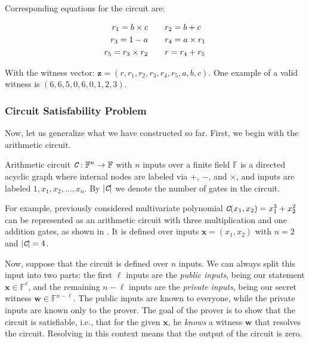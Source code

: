 \documentclass[../lecture-notes-148x210.tex]{subfiles}
\begin{document}
Corresponding equations for the circuit are:

\begin{equation*}
    \begin{aligned}
        r_1 = b \times c \hspace{10px} & & &
        r_2 = b + c \\
        r_3 = 1 - a \hspace{10px} & & &
        r_4 = a \times r_1 \\
        r_5 = r_3 \times r_2 \hspace{10px} & & &
        r = r_4 + r_5 \\
    \end{aligned}
\end{equation*}

With the witness vector: $\mathbf{z} = (r, r_1, r_2, r_3, r_4, r_5, a , b, c)$. One example of a valid witness is $(6, 6, 5, 0, 6, 0, 1, 2, 3)$.

\subsubsection{Circuit Satisfability Problem}

Now, let us generalize what we have constructed so far. First, we begin with the arithmetic circuit.

\begin{definition}
    Arithmetic circuit $\textit{\texttt{C}}: \mathbb{F}^n \to \mathbb{F}$ with $n$ inputs over a finite field $\mathbb{F}$ is a directed acyclic graph where internal nodes are labeled via $+$, $-$, and $\times$, and inputs are labeled $1,x_1,x_2,\dots,x_n$. By $|\textit{\texttt{C}}|$ we denote the number of gates in the circuit.
\end{definition}

\begin{example}
    For example, previously considered multivariate polynomial $\textit{\texttt{C}}(x_1,x_2) = x_1^3 + x_2^2$ can be represented as an arithmetic circuit with three multiplication and one addition gates, as shown in . It is defined over inputs $\mathbf{x}=(x_1,x_2)$ with $n=2$ and $|\textit{\texttt{C}}| = 4$.
\end{example}

Now, suppose that the circuit is defined over $n$ inputs. We can always split
this input into two parts: the first $\ell$ inputs are the \textit{public
inputs}, being our statement $\mathbf{x} \in \mathbb{F}^{\ell}$, and the
remaining $n-\ell$ inputs are the \textit{private inputs}, being our secret
witness $\mathbf{w} \in \mathbb{F}^{n-\ell}$. The public inputs are known to
everyone, while the private inputs are known only to the prover. The goal of the
prover is to show that the circuit is satisfiable, i.e., that for the given
$\mathbf{x}$, he \textit{knows} a witness $\mathbf{w}$ that resolves the
circuit. Resolving in this context means that the output of the circuit is zero.
\end{document}

